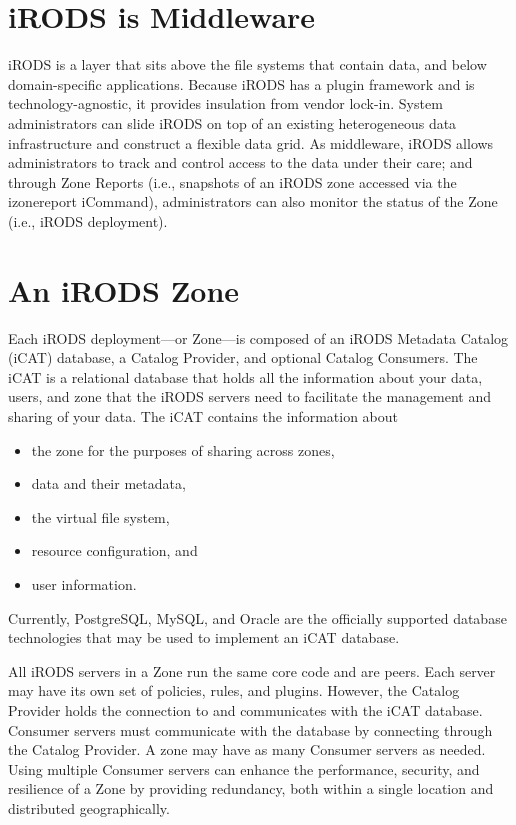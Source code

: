 \documentclass[10pt,oneside]{memoir}
\begin{document}
\section{iRODS is Middleware}

iRODS is a layer that sits above the file systems that contain data, and below domain-specific applications. Because iRODS has a plugin framework and is technology-agnostic, it provides insulation from vendor lock-in. System administrators can slide iRODS on top of an existing heterogeneous data infrastructure and construct a flexible data grid. As middleware, iRODS allows administrators to track and control access to the data under their care; and through Zone Reports (i.e., snapshots of an iRODS zone accessed via the izonereport iCommand), administrators can also monitor the status of the Zone (i.e., iRODS deployment).


\section{An iRODS Zone}

Each iRODS deployment---or Zone---is composed of an iRODS Metadata Catalog (iCAT) database, a Catalog Provider, and optional Catalog Consumers. The iCAT is a relational database that holds all the information about your data, users, and zone that the iRODS servers need to facilitate the management and sharing of your data. The iCAT contains the information about
 \begin{itemize}
 \item the zone for the purposes of sharing across zones,
 \item data and their metadata,
 \item the virtual file system,
 \item resource configuration, and
 \item user information.
 \end{itemize}

Currently, PostgreSQL, MySQL, and Oracle are the officially supported database technologies that may be used to implement an iCAT database.

All iRODS servers in a Zone run the same core code and are peers. Each server may have its own set of policies, rules, and plugins. However, the Catalog Provider holds the connection to and communicates with the iCAT database. Consumer servers must communicate with the database by connecting through the Catalog Provider. A zone may have as many Consumer servers as needed. Using multiple Consumer servers can enhance the performance, security, and resilience of a Zone by providing redundancy, both within a single location and distributed geographically.
\end{document}
